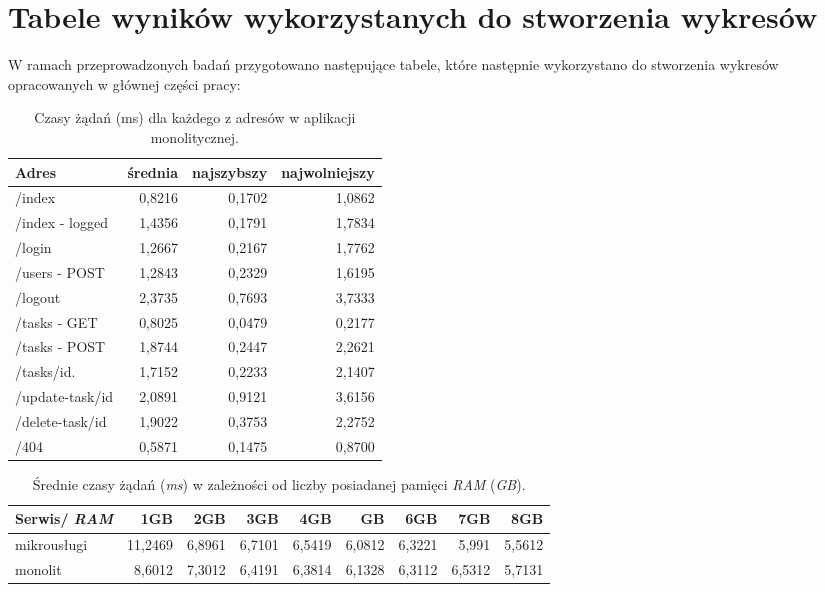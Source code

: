 \chapter{Tabele wyników wykorzystanych do stworzenia wykresów}
W ramach przeprowadzonych badań przygotowano następujące tabele, które następnie wykorzystano do stworzenia wykresów opracowanych w głównej części pracy:

\begin{table}[h!]
\centering
\caption{Czasy żądań (ms) dla każdego z adresów w aplikacji monolitycznej.}
\begin{tabular}{|l|r|r|r|}
\hline
\textbf{Adres}  & \textbf{średnia}   & \textbf{najszybszy} & \textbf{najwolniejszy} \\ \hline
/index             & 0,8216 & 0,1702     & 1,0862 \\ \hline
/index - logged    & 1,4356	& 0,1791	 & 1,7834 \\ \hline
/login             & 1,2667	& 0,2167	 & 1,7762 \\ \hline
/users - POST      & 1,2843	& 0,2329	 & 1,6195 \\ \hline
/logout	           & 2,3735	& 0,7693	 & 3,7333 \\ \hline
/tasks - GET       & 0,8025	& 0,0479     & 0,2177 \\ \hline
/tasks - POST      & 1,8744	& 0,2447	 & 2,2621 \\ \hline
/tasks/id.         & 1,7152	& 0,2233	 & 2,1407 \\ \hline
/update-task/id    & 2,0891	& 0,9121	 & 3,6156 \\ \hline
/delete-task/id    & 1,9022	& 0,3753	 & 2,2752 \\ \hline
/404               & 0,5871	& 0,1475	 & 0,8700 \\ \hline
\end{tabular}
\end{table}

\begin{table}[h!]
\centering
\caption{Średnie czasy żądań (\textit{ms}) w zależności od liczby posiadanej pamięci \textit{RAM} (\textit{GB}).}
\begin{tabular}{|l|r|r|r|r|r|r|r|r|}
\hline						
\textbf{Serwis/ \textit{RAM}} & \textbf{1GB}  & \textbf{2GB}	& \textbf{3GB}	& \textbf{4GB}	& \textbf{GB}	& \textbf{6GB}	& \textbf{7GB}	& \textbf{8GB} \\ \hline
mikrousługi  & 11,2469	& 6,8961	& 6,7101	& 6,5419 & 6,0812 & 6,3221	  & 5,991	& 5,5612 \\ \hline
monolit	      & 8,6012	& 7,3012	& 6,4191	& 6,3814 & 6,1328 & 6,3112	  & 6,5312  & 5,7131 \\ \hline
\end{tabular}
\end{table}

